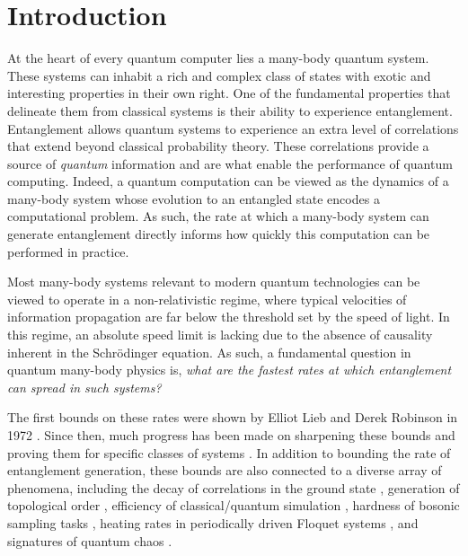 \chapter{Introduction}

At the heart of every quantum computer lies a many-body quantum system. These systems can inhabit a rich and complex class of states with exotic and interesting properties in their own right. One of the fundamental properties that delineate them from classical systems is their ability to experience entanglement. Entanglement allows quantum systems to experience an extra level of correlations that extend beyond classical probability theory. These correlations provide a source of \emph{quantum} information and are what enable the performance of quantum computing. Indeed, a quantum computation can be viewed as the dynamics of a many-body system whose evolution to an entangled state encodes a computational problem. As such, the rate at which a many-body system can generate entanglement directly informs how quickly this computation can be performed in practice.

Most many-body systems relevant to modern quantum technologies can be viewed to operate in a non-relativistic regime,
where typical velocities of information propagation are far below the threshold set by the speed of light. In this regime, an absolute speed limit is lacking due to the absence of causality inherent in the Schr\"odinger equation.
As such, a fundamental question in quantum many-body physics is, \emph{what are the fastest rates at which entanglement can spread in such systems?}

The first bounds on these rates were shown by Elliot Lieb and Derek Robinson in 1972 \cite{LR}.
Since then, much progress has been made on sharpening these bounds \cite{ChenLucas2021graphtheory,WangHazzard2020} and proving them for specific classes of systems \cite{Tran2019a,Chen2019,kuwaharaStrictlyLinearLight2020,Tran2021b}.
In addition to bounding the rate of entanglement generation, these bounds are also connected to a diverse array of phenomena, including the decay of correlations in the ground state \cite{Hastings2006}, generation of topological order \cite{Bravyi2006, Bravyi2010}, efficiency of classical/quantum simulation \cite{Osborne2006,Tran2019a}, hardness of bosonic sampling tasks \cite{Deshpande2018}, heating rates in periodically driven Floquet systems \cite{Abanin2015,Tran2019b}, and signatures of quantum chaos \cite{Lashkari2013,Guo2019}.

